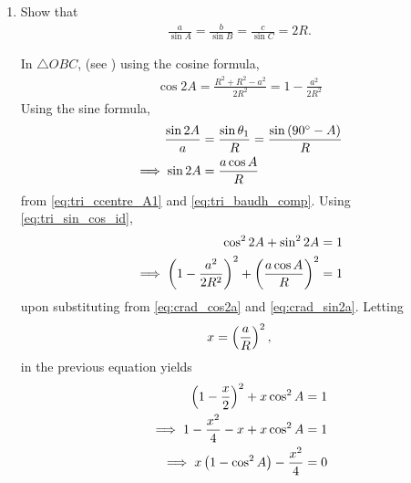 \renewcommand{\theequation}{\theenumi}
\begin{enumerate}[label=\thesection.\arabic*.,ref=\thesection.\theenumi]

\item Show that 
\begin{align}
\label{eq:tri_crad_R}
\frac{a}{\sin A} = \frac{b}{\sin B} = \frac{c}{\sin C} = 2R.
\end{align}
%
\iffalse
\begin{figure}[!ht]
	\begin{center}
		
		\resizebox{\columnwidth}{!}{}
	\end{center}
	\caption{Circumcentre $O$ of $\triangle ABC$}
	\label{fig:tri_ccentre}	
\end{figure}
\fi
		\solution In $\triangle OBC$, (see 
) using the cosine formula, 
\begin{align}
\cos 2A = \frac{R^2+R^2 - a^2}{2R^2} = 1 -\frac{a^2}{2R^2}
\label{eq:crad_cos2a}
\end{align}
%
Using the sine formula, 
\begin{align}
\frac{\sin 2A}{a} &= \frac{\sin \theta_1}{R} = \frac{\sin\brak{90\degree- A}}{R}
\\
\implies \sin 2A &= \frac{a\cos A}{R}
\label{eq:crad_sin2a}
\end{align}
%
from \eqref{eq:tri_ccentre_A1} and \eqref{eq:tri_baudh_comp}.	Using \eqref{eq:tri_sin_cos_id}, 
\begin{align}
\cos^2 2A + \sin^2 2A&= 1
\\
\implies \left(1 -\frac{a^2}{2R^2}\right)^2 + \left(\frac{a\cos A}{R}\right)^2 &= 1
\end{align}
%
upon substituting from \eqref{eq:crad_cos2a}  and \eqref{eq:crad_sin2a}.  Letting
%
\begin{align}
\label{eq:tri_crad_x}
x = \brak{\frac{a}{R}}^2,
\end{align}
%
in the previous equation yields
%
\begin{align}
 \left(1 -\frac{x}{2}\right)^2 + x\cos^2 A&= 1
\\
\implies 1 - \frac{x^2}{4} -x + x\cos^2 A&= 1
\\
\implies x\left(1-\cos^2 A\right) - \frac{x^2}{4} &= 0
\end{align}

\end{enumerate}
